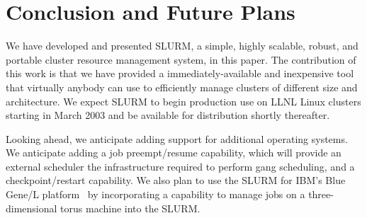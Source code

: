 \section{Conclusion and Future Plans}

We have developed and presented SLURM, a simple, highly scalable, robust, and portable cluster resource
management system, in this paper.
The contribution of this work is that we have provided a immediately-available
and inexpensive tool that virtually anybody can use to efficiently manage clusters of different size and architecture.
We expect SLURM to begin production use on LLNL Linux clusters 
starting in March 2003 and be available for distribution shortly 
thereafter. 

Looking ahead, we anticipate adding support for additional 
operating systems.
We anticipate adding a job preempt/resume capability, which will 
provide an external scheduler the infrastructure 
required to perform gang scheduling, and a checkpoint/restart capability.
We also plan to use the SLURM for IBM's Blue Gene/L platform~\cite{BGL} by incorporating a capability
to manage jobs on a three-dimensional torus machine into the SLURM.
